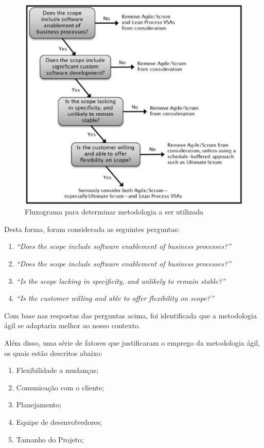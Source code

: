\begin{figure}[h]
	\centering
	\label{fig01}
		\includegraphics[keepaspectratio=true,scale=0.6]{figuras/fluxograma1.eps}
	\caption{Fluxograma para determinar metodologia a ser utilizada}
\end{figure}


\tab Desta forma, foram considerada as seguintes perguntas: \\

\begin{enumerate}
	\item \textsl{“Does the scope include software enablement of business processes?”}
	\item \textsl{“Does the scope include software enablement of business processes?”}
	\item \textsl{“Is the scope lacking in specificity, and unlikely to remain stable?”}
	\item \textsl{“Is the customer willing and able to offer flexibility on scope?”}
\end{enumerate}

\tab Com base nas respostas das perguntas acima, foi identificada que a metodologia ágil se adaptaria melhor ao nosso contexto.

\tab Além disso, uma série de fatores que justificaram o emprego da metodologia ágil, os quais estão descritos abaixo:

\begin{enumerate}
	\item {Flexibilidade a mudanças;}
	\item {Comunicação com o cliente;}
	\item {Planejamento;}
	\item {Equipe de desenvolvedores;}
	\item {Tamanho do Projeto;}
\end{enumerate}



